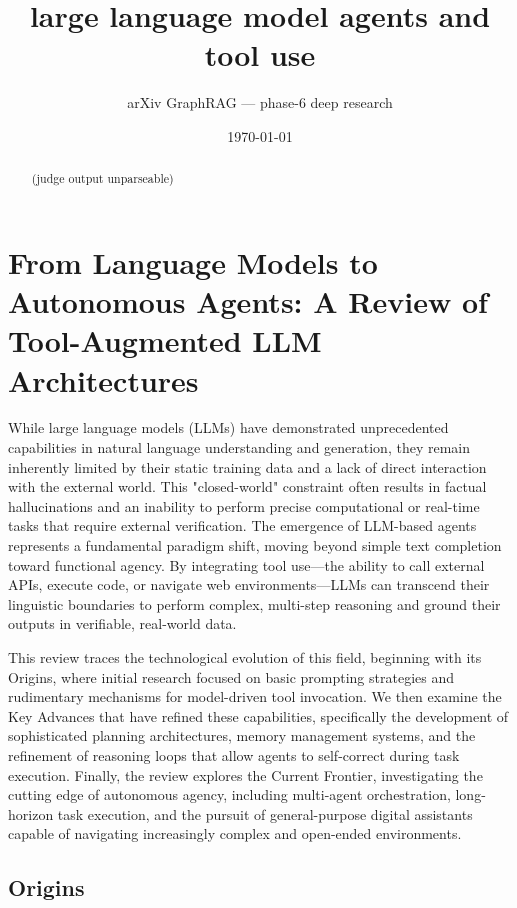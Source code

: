 \documentclass[11pt]{article}
\title{large language model agents and tool use}
\author{arXiv GraphRAG --- phase-6 deep research}
\date{\today}
\begin{document}
\maketitle

\begin{abstract}
(judge output unparseable)
\end{abstract}

\section{From Language Models to Autonomous Agents: A Review of Tool-Augmented LLM Architectures}

While large language models (LLMs) have demonstrated unprecedented capabilities in natural language understanding and generation, they remain inherently limited by their static training data and a lack of direct interaction with the external world. This "closed-world" constraint often results in factual hallucinations and an inability to perform precise computational or real-time tasks that require external verification. The emergence of LLM-based agents represents a fundamental paradigm shift, moving beyond simple text completion toward functional agency. By integrating tool use—the ability to call external APIs, execute code, or navigate web environments—LLMs can transcend their linguistic boundaries to perform complex, multi-step reasoning and ground their outputs in verifiable, real-world data.

This review traces the technological evolution of this field, beginning with its Origins, where initial research focused on basic prompting strategies and rudimentary mechanisms for model-driven tool invocation. We then examine the Key Advances that have refined these capabilities, specifically the development of sophisticated planning architectures, memory management systems, and the refinement of reasoning loops that allow agents to self-correct during task execution. Finally, the review explores the Current Frontier, investigating the cutting edge of autonomous agency, including multi-agent orchestration, long-horizon task execution, and the pursuit of general-purpose digital assistants capable of navigating increasingly complex and open-ended environments.

\subsection{Origins}
\end{document}
